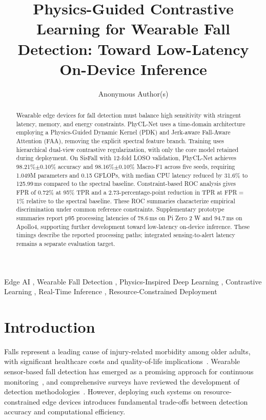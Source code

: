 \documentclass[jec]{acnsart}
\title{Physics-Guided Contrastive Learning for Wearable Fall Detection: Toward Low-Latency On-Device Inference}
\author[1]{Anonymous Author(s)}
\begin{document}
\begin{abstract}
Wearable edge devices for fall detection must balance high sensitivity with stringent latency, memory, and energy constraints. PhyCL-Net uses a time-domain architecture employing a Physics-Guided Dynamic Kernel (PDK) and Jerk-aware Fall-Aware Attention (FAA), removing the explicit spectral feature branch. Training uses hierarchical dual-view contrastive regularization, with only the core model retained during deployment. On SisFall with 12-fold LOSO validation, PhyCL-Net achieves 98.21\%$\pm$0.10\% accuracy and 98.16\%$\pm$0.10\% Macro-F1 across five seeds, requiring 1.049M parameters and 0.15 GFLOPs, with median CPU latency reduced by 31.6\% to 125.99\,ms compared to the spectral baseline. Constraint-based ROC analysis gives FPR of 0.72\% at 95\% TPR and a 2.73-percentage-point reduction in TPR at FPR${=}$1\% relative to the spectral baseline. These ROC summaries characterize empirical discrimination under common reference constraints. Supplementary prototype summaries report p95 processing latencies of 78.6\,ms on Pi Zero 2 W and 94.7\,ms on Apollo4, supporting further development toward low-latency on-device inference. These timings describe the reported processing paths; integrated sensing-to-alert latency remains a separate evaluation target.
\end{abstract}

\begin{keywords}
  Edge AI \sep
  Wearable Fall Detection \sep
  Physics-Inspired Deep Learning \sep
  Contrastive Learning \sep
  Real-Time Inference \sep
  Resource-Constrained Deployment
\end{keywords}

\maketitle

\section{Introduction}

Falls represent a leading cause of injury-related morbidity among older adults, with significant healthcare costs and quality-of-life implications~\cite{Bergen2016Falls}. Wearable sensor-based fall detection has emerged as a promising approach for continuous monitoring~\cite{Wu2015Wearable}, and comprehensive surveys have reviewed the development of detection methodologies~\cite{Ramachandran2020Survey,mubashir2013survey}. However, deploying such systems on resource-constrained edge devices introduces fundamental trade-offs between detection accuracy and computational efficiency.
\end{document}
